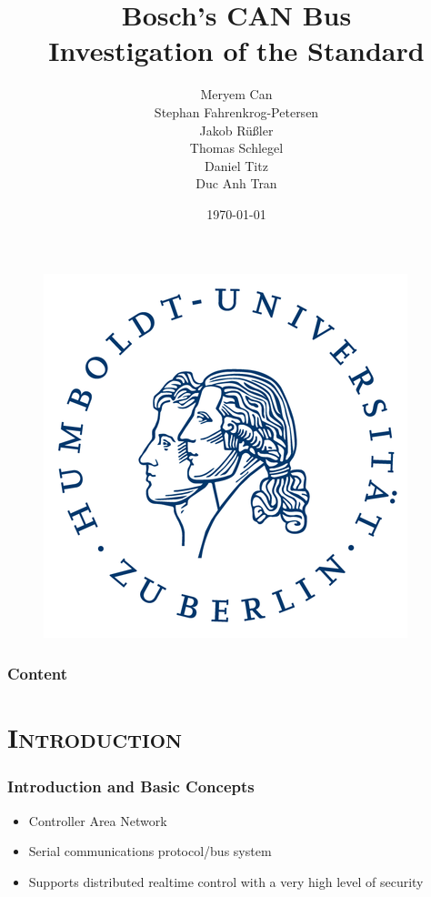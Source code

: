 \documentclass[xcolor=x11names,compress]{beamer}
\renewcommand{\(}{\begin{columns}}
\renewcommand{\)}{\end{columns}}
\newcommand{\<}[1]{\begin{column}{#1}}
\renewcommand{\>}{\end{column}}
\begin{document}
\begin{frame}[plain]
  \begin{figure}
    \flushright
      \includegraphics[scale=0.12]{hu_logo}
    \vspace*{-0.4cm}
  \end{figure}

  \title{\textbf{Bosch's CAN Bus\\Investigation of the Standard}\\\vspace{0.2cm}}

  \author{Meryem Can\\Stephan Fahrenkrog-Petersen\\Jakob Rüßler\\Thomas Schlegel\\
  Daniel Titz\\Duc Anh Tran\\\vspace{0.3cm}}


\date{\today}
\titlepage
\end{frame}

\begin{frame}
\frametitle{Content}
\tableofcontents[]
\end{frame}

\section{\scshape Introduction}
\begin{frame}
  \frametitle{Introduction and Basic Concepts}
  \begin{itemize}
      \item Controller Area Network~\cite{can}
      \item Serial communications protocol/bus system
      \item Supports distributed realtime control with a very high level of security 
   
  \end{itemize}

\end{frame}
\end{document}
